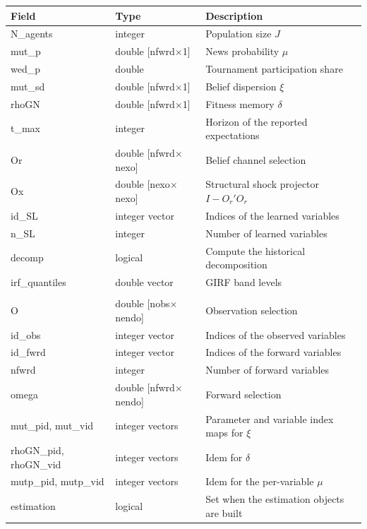 \documentclass[11pt,a4paper]{article}
\begin{document}
\begin{longtable}{>{\ttfamily\small}p{4.4cm} >{\ttfamily\small}p{3cm} p{6.6cm}}
\toprule
\normalfont\textbf{Field} & \normalfont\textbf{Type} & \textbf{Description} \\
\midrule
\endhead
N\_agents  & integer                  & Population size $J$ \\
mut\_p     & double [nfwrd$\times$1]  & News probability $\mu$ \\
wed\_p     & double                   & Tournament participation share \\
mut\_sd    & double [nfwrd$\times$1]  & Belief dispersion $\xi$ \\
rhoGN      & double [nfwrd$\times$1]  & Fitness memory $\delta$ \\
t\_max     & integer                  & Horizon of the reported expectations \\
Or         & double [nfwrd$\times$nexo] & Belief channel selection \\
Ox         & double [nexo$\times$nexo]  & Structural shock projector $I - O_r'O_r$ \\
id\_SL     & integer vector           & Indices of the learned variables \\
n\_SL      & integer                  & Number of learned variables \\
decomp     & logical                  & Compute the historical decomposition \\
irf\_quantiles & double vector        & GIRF band levels \\
\midrule
\multicolumn{3}{l}{\normalfont\textit{Added by \texttt{setup\_learning\_estimation}}} \\
\midrule
O          & double [nobs$\times$nendo] & Observation selection \\
id\_obs    & integer vector           & Indices of the observed variables \\
id\_fwrd   & integer vector           & Indices of the forward variables \\
nfwrd      & integer                  & Number of forward variables \\
omega      & double [nfwrd$\times$nendo] & Forward selection \\
mut\_pid, mut\_vid & integer vectors  & Parameter and variable index maps for $\xi$ \\
rhoGN\_pid, rhoGN\_vid & integer vectors & Idem for $\delta$ \\
mutp\_pid, mutp\_vid & integer vectors & Idem for the per-variable $\mu$ \\
estimation & logical                  & Set when the estimation objects are built \\
\bottomrule
\end{longtable}
\end{document}
